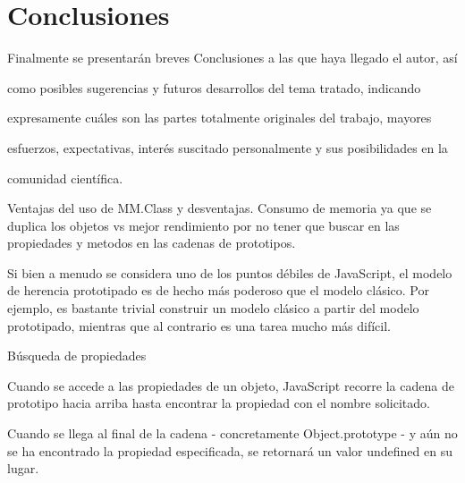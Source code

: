 \newpage\mbox{}\thispagestyle{empty}

\chapter{Conclusiones}


Finalmente se presentarán breves Conclusiones a las que haya llegado el autor, así 

como posibles sugerencias y futuros desarrollos del tema tratado, indicando 

expresamente cuáles son las partes totalmente originales del trabajo, mayores 

esfuerzos, expectativas, interés suscitado personalmente y sus posibilidades en la 

comunidad científica.




Ventajas del uso de MM.Class y desventajas.
Consumo de memoria ya que se duplica los objetos vs mejor rendimiento por no tener que buscar en las
propiedades y metodos en las cadenas de prototipos. 



Si bien a menudo se considera uno de los puntos débiles de JavaScript, el modelo de herencia
prototipado es de hecho más poderoso que el modelo clásico. Por ejemplo, es bastante trivial
construir un modelo clásico a partir del modelo prototipado, mientras que al contrario es una tarea
mucho más difícil.


Búsqueda de propiedades

Cuando se accede a las propiedades de un objeto, JavaScript recorre la cadena de prototipo hacia
arriba hasta encontrar la propiedad con el nombre solicitado.

Cuando se llega al final de la cadena - concretamente Object.prototype - y aún no se ha encontrado
la propiedad especificada, se retornará un valor undefined en su lugar.